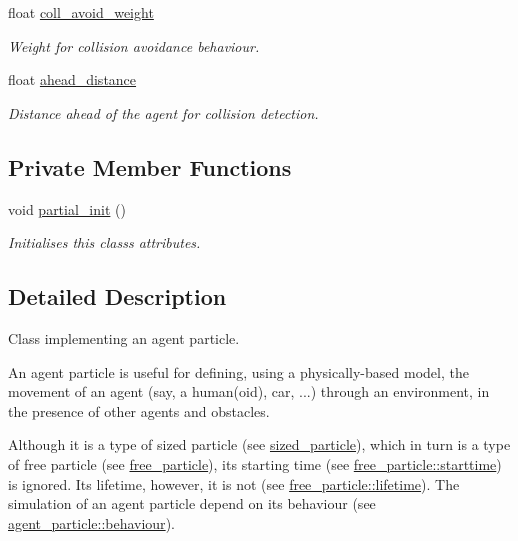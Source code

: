 \begin{DoxyCompactItemize}
float \hyperlink{classphysim_1_1particles_1_1agent__particle_acf2c406d0b41c07d3f786701dec35020}{coll\+\_\+avoid\+\_\+weight}
\begin{DoxyCompactList}\small\item\em Weight for collision avoidance behaviour. \end{DoxyCompactList}\item 
\mbox{\label{classphysim_1_1particles_1_1agent__particle_ab08a6b3f3a8f27b3281d981146135234}} 
float \hyperlink{classphysim_1_1particles_1_1agent__particle_ab08a6b3f3a8f27b3281d981146135234}{ahead\+\_\+distance}
\begin{DoxyCompactList}\small\item\em Distance ahead of the agent for collision detection. \end{DoxyCompactList}\end{DoxyCompactItemize}
\subsection*{Private Member Functions}
\begin{DoxyCompactItemize}
\item 
void \hyperlink{classphysim_1_1particles_1_1agent__particle_af48f594a16ab6c2ff3b475fa7f64266c}{partial\+\_\+init} ()
\begin{DoxyCompactList}\small\item\em Initialises this class\textquotesingle{}s attributes. \end{DoxyCompactList}\end{DoxyCompactItemize}


\subsection{Detailed Description}
Class implementing an agent particle. 

An agent particle is useful for defining, using a physically-\/based model, the movement of an agent (say, a human(oid), car, ...) through an environment, in the presence of other agents and obstacles.

Although it is a type of sized particle (see \hyperlink{classphysim_1_1particles_1_1sized__particle}{sized\+\_\+particle}), which in turn is a type of free particle (see \hyperlink{classphysim_1_1particles_1_1free__particle}{free\+\_\+particle}), its starting time (see \hyperlink{classphysim_1_1particles_1_1free__particle_ad0379ba926ecc909bfbfb373045bfcf9}{free\+\_\+particle\+::starttime}) is ignored. Its lifetime, however, it is not (see \hyperlink{classphysim_1_1particles_1_1free__particle_a5870d6fd3167d2c6120f887f45fe50fc}{free\+\_\+particle\+::lifetime}). The simulation of an agent particle depend on its behaviour (see \hyperlink{classphysim_1_1particles_1_1agent__particle_af219e3f46630bb7f51f3d00952ed4f1c}{agent\+\_\+particle\+::behaviour}). 

